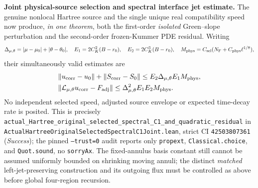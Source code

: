\documentclass[11pt]{amsart}
\begin{document}
\medskip
\noindent\textbf{Joint physical-source selection and spectral interface jet
estimate.}
The genuine nonlocal Hartree source and the single unique real
compatibility speed now produce, \emph{in one theorem}, both the
first-order \emph{isolated} Green--slope perturbation and the
second-order frozen-Kummer PDE residual. Writing
\[
  \Delta_{\mu,\theta}
    =|\mu-\mu_0|+|\theta-\theta_0|,
  \quad E_1=2C_K^2(B-r_0),\quad E_2=2C_K^3(B-r_0),
  \quad M_{\rm phys}
    =C_{\rm sel}(N_{\rm F}+C_{\rm phys}\ell^{1/8}),
\]
their simultaneously valid estimates are
\[
 \begin{aligned}
 &\|u_{\rm corr}-u_0\|
   +\|S_{\rm corr}-S_0\|
     \le E_2\Delta_{\mu,\theta}E_1M_{\rm phys},\\
 &\|\mathcal L_{\mu,\theta}u_{\rm corr}
       -F_{\rm adj}\|
     \le\Delta_{\mu,\theta}^{2}E_1E_2M_{\rm phys}.
 \end{aligned}
\]
No independent selected speed, adjusted source envelope or expected
time-decay rate is posited. This is precisely
\texttt{actual\_Hartree\_original\_selected\_spectral\_C1\_and\_quadratic\_residual}
in \texttt{ActualHartreeOriginalSelectedSpectralC1Joint.lean},
strict CI \texttt{42503807361} (\emph{Success});
the pinned \texttt{--trust=0} audit reports only
\texttt{propext}, \texttt{Classical.choice}, and
\texttt{Quot.sound}, no \texttt{sorryAx}.
The fixed-annulus basis constant still cannot be assumed uniformly
bounded on shrinking moving annuli; the distinct \emph{matched}
left-jet-preserving construction and its outgoing flux must be
controlled as above before global four-region recursion.
\end{document}
